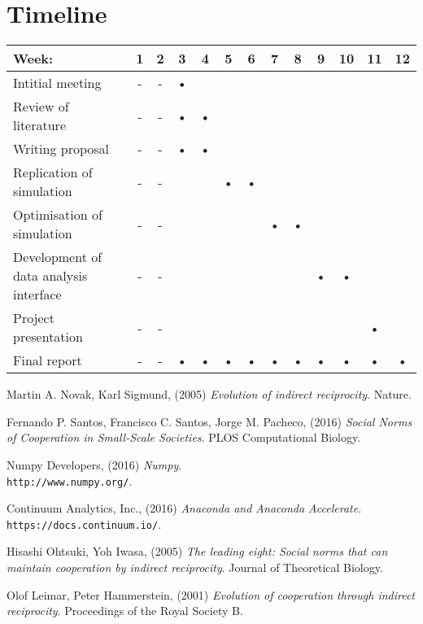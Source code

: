 \documentclass[10pt,a4paper]{article}
\begin{document}
\section{Timeline}
\begin{tabular}{|l|c|c|c|c|c|c|c|c|c|c|c|c|}
\hline 
Week: & 1 & 2 & 3 & 4 & 5 & 6 & 7 & 8 & 9 & 10 & 11 & 12 \\ 
\hline 
Intitial meeting & - & - & • &  &  &  &  &  &  &  &  &  \\ 
\hline 
Review of literature & - & - & • & • &  &  &  &  &  &  &  &  \\ 
\hline 
Writing proposal & - & - & • & • &  &  &  &  &  &  &  &  \\ 
\hline 
Replication of simulation & - & - &  &  & • & • &  &  &  &  &  &  \\ 
\hline 
Optimisation of simulation & - & - &  &  &  &  & • & • &  &  &  &  \\ 
\hline 
Development of data analysis interface & - & - &  &  &  &  &  &  & • & • &  &  \\ 
\hline 
Project presentation & - & - &  &  &  &  &  &  &  &  & • &  \\ 
\hline 
Final report & - & - & • & • & • & • & • & • & • & • & • & • \\ 
\hline 
\end{tabular}

\pagebreak
\begin{thebibliography}{9}

Martin A. Novak, Karl Sigmund, (2005) 
\textit{Evolution of indirect reciprocity}. 
Nature.

Fernando P. Santos, Francisco C. Santos, Jorge M. Pacheco, (2016) 
\textit{Social Norms of Cooperation in Small-Scale Societies}. 
PLOS Computational Biology.

Numpy Developers, (2016) 
\textit{Numpy}. 
\\\texttt{http://www.numpy.org/}.

Continuum Analytics, Inc., (2016) 
\textit{Anaconda and Anaconda Accelerate}. 
\\\texttt{https://docs.continuum.io/}.

Hisashi Ohtsuki, Yoh Iwasa, (2005) 
\textit{The leading eight: Social norms that can maintain cooperation by indirect reciprocity}. 
Journal of Theoretical Biology.

Olof Leimar, Peter Hammerstein, (2001) 
\textit{Evolution of cooperation through indirect reciprocity}. 
Proceedings of the Royal Society B.

\end{thebibliography}
\end{document}
